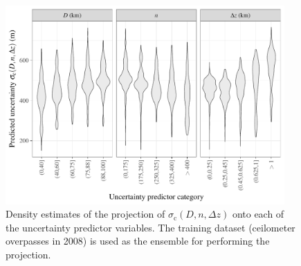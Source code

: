 \documentclass[essd,manuscript]{copernicus}\usepackage[]{graphicx}\usepackage[]{color}
\newenvironment{knitrout}{}{} %
\newcommand\sigmac{\ensuremath{\sigma_\text{c}}}
\begin{document}
\begin{figure}
  \centering
\begin{knitrout}
\color{fgcolor}

{\centering \includegraphics[width=0.95\textwidth]{figure/method-eval-uncertainty-1} 

}



\end{knitrout}
  \caption{Density estimates of the projection of
    $\sigmac(D, n, \Delta z)$ onto each of the uncertainty
    predictor variables.  The training dataset (ceilometer overpasses in 2008)
    is used as the ensemble for performing the projection.}
  \label{fig:eval-uncertainty}
\end{figure}
\end{document}
